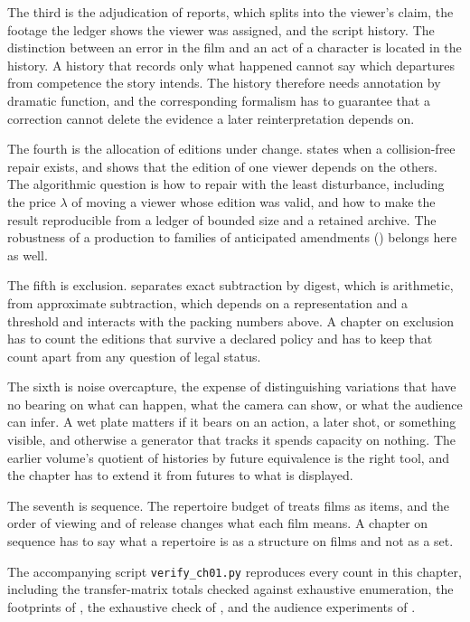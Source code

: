 \documentclass[11pt,twoside,openright]{book}
\theoremstyle{plain}
\theoremstyle{definition}
\theoremstyle{remark}
\begin{document}
The third is the adjudication of reports, which  splits into the viewer's claim, the footage the ledger shows the viewer was assigned, and the script history. The distinction between an error in the film and an act of a character is located in the history. A history that records only what happened cannot say which departures from competence the story intends. The history therefore needs annotation by dramatic function, and the corresponding formalism has to guarantee that a correction cannot delete the evidence a later reinterpretation depends on.

The fourth is the allocation of editions under change.  states when a collision-free repair exists, and  shows that the edition of one viewer depends on the others. The algorithmic question is how to repair with the least disturbance, including the price $\lambda$ of moving a viewer whose edition was valid, and how to make the result reproducible from a ledger of bounded size and a retained archive. The robustness of a production to families of anticipated amendments () belongs here as well.

The fifth is exclusion.  separates exact subtraction by digest, which is arithmetic, from approximate subtraction, which depends on a representation and a threshold and interacts with the packing numbers above. A chapter on exclusion has to count the editions that survive a declared policy and has to keep that count apart from any question of legal status.

The sixth is noise overcapture, the expense of distinguishing variations that have no bearing on what can happen, what the camera can show, or what the audience can infer. A wet plate matters if it bears on an action, a later shot, or something visible, and otherwise a generator that tracks it spends capacity on nothing. The earlier volume's quotient of histories by future equivalence is the right tool, and the chapter has to extend it from futures to what is displayed.

The seventh is sequence. The repertoire budget of  treats films as items, and the order of viewing and of release changes what each film means. A chapter on sequence has to say what a repertoire is as a structure on films and not as a set.

The accompanying script \texttt{verify\_ch01.py} reproduces every count in this chapter, including the transfer-matrix totals checked against exhaustive enumeration, the footprints of , the exhaustive check of , and the audience experiments of .
\end{document}
